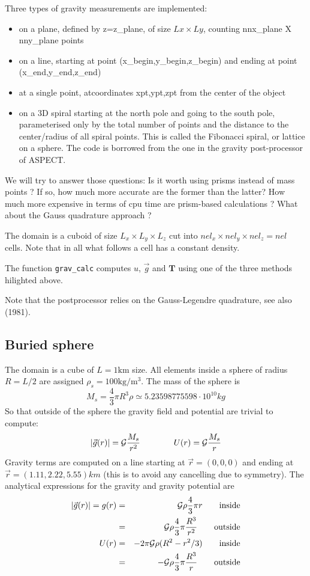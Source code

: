 Three types of gravity measurements are implemented:
\begin{itemize}
\item on a plane, defined by z=z\_{plane}, of size $Lx \times Ly$, counting nnx\_plane X nny\_plane points
\item on a line, starting at point (x\_begin,y\_begin,z\_begin) and ending at point (x\_end,y\_end,z\_end)
\item at a single point, atcoordinates xpt,ypt,zpt from the center of the object
\item on a 3D spiral starting at the north pole and going to the south pole, parameterised only 
by the total number of points and the distance to the center/radius of all spiral points.
This is called the Fibonacci spiral, or lattice on a sphere. The code is borrowed from the 
one in the gravity post-processor of ASPECT.
\end{itemize}

We will try to answer those questions:
Is it worth using prisms instead of mass points ?  
If so, how much more accurate are the former than the latter?
How much more expensive in terms of cpu time are prism-based calculations ?
What about the Gauss quadrature approach ? 

The domain is a cuboid of size $L_x\times L_y \times L_z$ cut into $nel_x \times nel_y \times nel_z=nel$ cells.
Note that in all what follows a cell has a constant density. 

The function {\tt grav\_calc} computes $u$, $\vec{g}$ and ${\bm T}$ using one of the 
three methods hilighted above. 

Note that the \aspect postprocessor relies on the Gauss-Legendre quadrature, 
see also \textcite{vohb81} (1981).

\newpage
\subsection*{Buried sphere}

The domain is a cube of $L=1\si{\km}$ size. All elements inside a sphere of radius $R=L/2$ are assigned
$\rho_s=100\si{\kg\per\cubic\metre}$.
The mass of the sphere is 
\[
M_s = \frac{4}{3}\pi R^3 \rho \simeq 5.23598775598 \cdot 10^{10} \si{kg}
\]
So that outside of the sphere the gravity field and potential are trivial to compute:
\[
|\vec{g}(r)|={\cal G}\frac{M_s}{r^2}
\qquad
\qquad
U(r)={\cal G}\frac{M_s}{r}
\]
Gravity terms are computed on a line starting at $\vec{r}=(0,0,0)$ and ending at $\vec{r}=(1.11,2.22,5.55)\si{km}$ (this is to avoid any cancelling due to symmetry).
The analytical expressions for the gravity and gravity potential are 
\begin{eqnarray}
|\vec{g}(r)|=g(r) 
&=& {\cal G} \rho \frac{4}{3}\pi r \qquad \text{inside} \nonumber\\
&=& {\cal G} \rho \frac{4}{3}\pi \frac{R^3}{r^2}  \qquad \text{outside} \nonumber\\
U(r) 
&=& - 2 \pi {\cal G} \rho (R^2-r^2/3) \qquad \text{inside} \nonumber\\
&=& - {\cal G} \rho \frac{4}{3}\pi \frac{R^3}{r}  \qquad \text{outside} \nonumber
\end{eqnarray}


